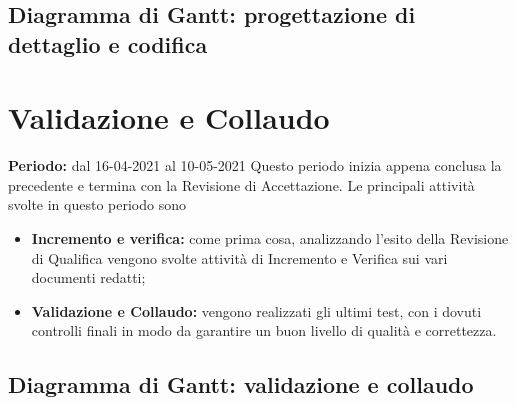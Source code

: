 \subsection{Diagramma di Gantt: progettazione di dettaglio e codifica}\label{4.4.1}

\section{Validazione e Collaudo}\label{4.5}
\textbf{Periodo:} dal 16-04-2021 al 10-05-2021
Questo periodo inizia appena conclusa la precedente e termina con la Revisione di Accettazione.
Le principali attività svolte in questo periodo sono
\begin{itemize}
	\item \textbf{Incremento e verifica:} come prima cosa, analizzando l'esito della Revisione di Qualifica vengono svolte attività di Incremento e Verifica sui vari documenti redatti;
	\item \textbf{Validazione e Collaudo:} vengono realizzati gli ultimi test, con i dovuti controlli finali in modo da garantire un buon livello di qualità e correttezza.
\end{itemize}
\subsection{Diagramma di Gantt: validazione e collaudo}\label{4.5.1}